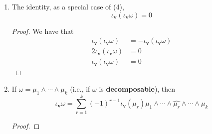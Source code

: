 \documentclass[../psets.tex]{subfiles}
\begin{document}
\begin{enumerate}[label={\textbf{2.5.\roman*.}}]
\begin{enumerate}
\begin{proof}
\begin{align*}
                &= -[\iota_{\bm{v}}(\iota_{\bm{w}}\omega)]_p\\
                &= [-\iota_{\bm{v}}(\iota_{\bm{w}}\omega)]_p
            \end{align*}
        \end{proof}
        \item The identity, as a special case of (4),
        \begin{equation*}
            \iota_{\bm{v}}(\iota_{\bm{v}}\omega) = 0
        \end{equation*}
        \begin{proof}
            We have that
            \begin{align*}
                \iota_{\bm{v}}(\iota_{\bm{v}}\omega) &= -\iota_{\bm{v}}(\iota_{\bm{v}}\omega)\\
                2\iota_{\bm{v}}(\iota_{\bm{v}}\omega) &= 0\\
                \iota_{\bm{v}}(\iota_{\bm{v}}\omega) &= 0
            \end{align*}
        \end{proof}
        \item If $\omega=\mu_1\wedge\cdots\wedge\mu_k$ (i.e., if $\omega$ is \textbf{decomposable}), then
        \begin{equation*}
            \iota_{\bm{v}}\omega = \sum_{r=1}^k(-1)^{r-1}\iota_{\bm{v}}(\mu_r)\mu_1\wedge\cdots\wedge\widehat{\mu_r}\wedge\cdots\wedge\mu_k
        \end{equation*}
        \begin{proof}

\end{proof}
\end{enumerate}
\end{enumerate}
\end{document}
